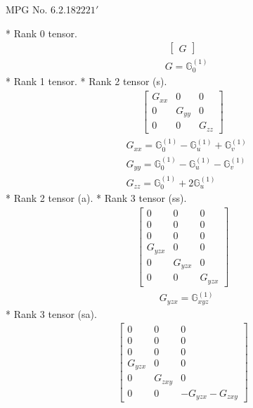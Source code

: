 \documentclass[fleqn,8pt,landscape]{jsarticle}
\begin{document}
\setcounter{MaxMatrixCols}{32}

\renewcommand{\tablename}{Table~}
\renewcommand{\figurename}{Figure~}
\begin{center}
\LARGE
MPG No. 6.2.18\quad$2221'$
\end{center}
* Rank 0 tensor.
\begin{align*}
\begin{bmatrix} G \end{bmatrix}
\end{align*}
\begin{align*}
& G = \mathbb{G}_{0}^{(1)}
\end{align*}
* Rank 1 tensor.
* Rank 2 tensor (s).
\begin{align*}
\begin{bmatrix} G_{xx} & 0 & 0 \\ 0 & G_{yy} & 0 \\ 0 & 0 & G_{zz} \end{bmatrix}
\end{align*}
\begin{align*}
& G_{xx} = \mathbb{G}_{0}^{(1)} - \mathbb{G}_{u}^{(1)} + \mathbb{G}_{v}^{(1)} \\
& G_{yy} = \mathbb{G}_{0}^{(1)} - \mathbb{G}_{u}^{(1)} - \mathbb{G}_{v}^{(1)} \\
& G_{zz} = \mathbb{G}_{0}^{(1)} + 2 \mathbb{G}_{u}^{(1)}
\end{align*}
* Rank 2 tensor (a).
* Rank 3 tensor (ss).
\begin{align*}
\begin{bmatrix} 0 & 0 & 0 \\ 0 & 0 & 0 \\ 0 & 0 & 0 \\ G_{yzx} & 0 & 0 \\ 0 & G_{yzx} & 0 \\ 0 & 0 & G_{yzx} \end{bmatrix}
\end{align*}
\begin{align*}
& G_{yzx} = \mathbb{G}_{xyz}^{(1)}
\end{align*}
* Rank 3 tensor (sa).
\begin{align*}
\begin{bmatrix} 0 & 0 & 0 \\ 0 & 0 & 0 \\ 0 & 0 & 0 \\ G_{yzx} & 0 & 0 \\ 0 & G_{zxy} & 0 \\ 0 & 0 & - G_{yzx} - G_{zxy} \end{bmatrix}
\end{align*}
\end{document}
